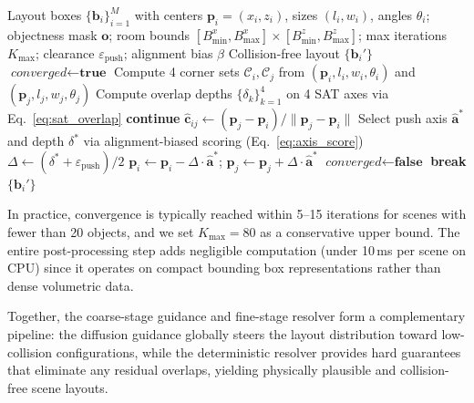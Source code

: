 \begin{algorithm}[t]
\caption{Post-Processing Collision Resolver}
\label{alg:collision_resolver}
\begin{algorithmic}[1]
\REQUIRE Layout boxes $\{\mathbf{b}_i\}_{i=1}^{M}$ with centers $\mathbf{p}_i = (x_i, z_i)$, sizes $(l_i, w_i)$, angles $\theta_i$; objectness mask $\mathbf{o}$; room bounds $[B_{\min}^x, B_{\max}^x] \times [B_{\min}^z, B_{\max}^z]$; max iterations $K_{\max}$; clearance $\varepsilon_{\mathrm{push}}$; alignment bias $\beta$
\ENSURE Collision-free layout $\{\mathbf{b}_i'\}$
    \STATE $\textit{converged} \gets \textbf{true}$
        \STATE Compute 4 corner sets $\mathcal{C}_i, \mathcal{C}_j$ from $(\mathbf{p}_i, l_i, w_i, \theta_i)$ and $(\mathbf{p}_j, l_j, w_j, \theta_j)$
        \STATE Compute overlap depths $\{\delta_k\}_{k=1}^{4}$ on 4 SAT axes via Eq.~\eqref{eq:sat_overlap}
            \STATE \textbf{continue} 
        \ENDIF
        \STATE $\hat{\mathbf{c}}_{ij} \gets (\mathbf{p}_j - \mathbf{p}_i) / \|\mathbf{p}_j - \mathbf{p}_i\|$
        \STATE Select push axis $\hat{\mathbf{a}}^*$ and depth $\delta^*$ via alignment-biased scoring (Eq.~\eqref{eq:axis_score})
        \STATE $\Delta \gets (\delta^* + \varepsilon_{\mathrm{push}}) / 2$
        \STATE $\mathbf{p}_i \gets \mathbf{p}_i - \Delta \cdot \hat{\mathbf{a}}^*$; \quad $\mathbf{p}_j \gets \mathbf{p}_j + \Delta \cdot \hat{\mathbf{a}}^*$ 
        \STATE $\textit{converged} \gets \textbf{false}$
    \ENDFOR
        \STATE \textbf{break} 
    \ENDIF
\ENDFOR
\RETURN $\{\mathbf{b}_i'\}$
\end{algorithmic}
\end{algorithm}

In practice, convergence is typically reached within 5--15 iterations for scenes with fewer than 20 objects, and we set $K_{\max} = 80$ as a conservative upper bound.
The entire post-processing step adds negligible computation (under 10\,ms per scene on CPU) since it operates on compact bounding box representations rather than dense volumetric data.

Together, the coarse-stage guidance and fine-stage resolver form a complementary pipeline: the diffusion guidance globally steers the layout distribution toward low-collision configurations, while the deterministic resolver provides hard guarantees that eliminate any residual overlaps, yielding physically plausible and collision-free scene layouts.
